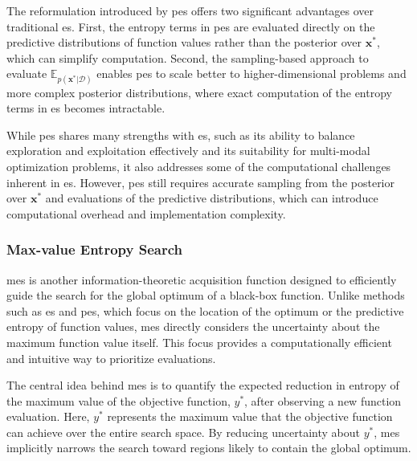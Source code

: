 The reformulation introduced by \ac{pes} offers two significant advantages over traditional \ac{es}. First, the entropy terms in \ac{pes} are evaluated directly on the predictive distributions of function values rather than the posterior over $\mathbf{x}^*$, which can simplify computation. Second, the sampling-based approach to evaluate $\mathbb{E}_{p({\mathbf{x}^* \vert \mathcal{D}})}$ enables \ac{pes} to scale better to higher-dimensional problems and more complex posterior distributions, where exact computation of the entropy terms in \ac{es} becomes intractable.

While \ac{pes} shares many strengths with \ac{es}, such as its ability to balance exploration and exploitation effectively and its suitability for multi-modal optimization problems, it also addresses some of the computational challenges inherent in \ac{es}. However, \ac{pes} still requires accurate sampling from the posterior over $\mathbf{x}^*$ and evaluations of the predictive distributions, which can introduce computational overhead and implementation complexity.

\subsubsection{Max-value Entropy Search}
\label{section:max_value_entropy_search}

\acf{mes} \citep{wang2017max} is another information-theoretic acquisition function designed to efficiently guide the search for the global optimum of a black-box function. Unlike methods such as \ac{es} and \ac{pes}, which focus on the location of the optimum or the predictive entropy of function values, \ac{mes} directly considers the uncertainty about the maximum function value itself. This focus provides a computationally efficient and intuitive way to prioritize evaluations.

The central idea behind \ac{mes} is to quantify the expected reduction in entropy of the maximum value of the objective function, $y^*$, after observing a new function evaluation. Here, $y^*$ represents the maximum value that the objective function can achieve over the entire search space. By reducing uncertainty about $y^*$, \ac{mes} implicitly narrows the search toward regions likely to contain the global optimum.

